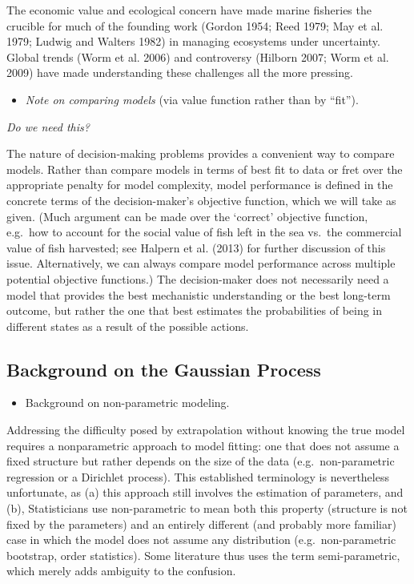 \documentclass[author-year, review]{elsarticle} %
\begin{document}
The economic value and ecological concern have made marine fisheries the
crucible for much of the founding work (Gordon 1954; Reed 1979; May et
al. 1979; Ludwig and Walters 1982) in managing ecosystems under
uncertainty. Global trends (Worm et al. 2006) and controversy (Hilborn
2007; Worm et al. 2009) have made understanding these challenges all the
more pressing.

\begin{itemize}
\itemsep1pt\parskip0pt
\item
  \emph{Note on comparing models} (via value function rather than by
  ``fit'').
\end{itemize}

\emph{Do we need this?}

The nature of decision-making problems provides a convenient way to
compare models. Rather than compare models in terms of best fit to data
or fret over the appropriate penalty for model complexity, model
performance is defined in the concrete terms of the decision-maker's
objective function, which we will take as given. (Much argument can be
made over the `correct' objective function, e.g.~how to account for the
social value of fish left in the sea vs.~the commercial value of fish
harvested; see Halpern et al. (2013) for further discussion of this
issue. Alternatively, we can always compare model performance across
multiple potential objective functions.) The decision-maker does not
necessarily need a model that provides the best mechanistic
understanding or the best long-term outcome, but rather the one that
best estimates the probabilities of being in different states as a
result of the possible actions.

\subsection{Background on the Gaussian
Process}\label{background-on-the-gaussian-process}

\begin{itemize}
\itemsep1pt\parskip0pt
\item
  Background on non-parametric modeling.
\end{itemize}

Addressing the difficulty posed by extrapolation without knowing the
true model requires a nonparametric approach to model fitting: one that
does not assume a fixed structure but rather depends on the size of the
data (e.g.~non-parametric regression or a Dirichlet process). This
established terminology is nevertheless unfortunate, as (a) this
approach still involves the estimation of parameters, and (b),
Statisticians use non-parametric to mean both this property (structure
is not fixed by the parameters) and an entirely different (and probably
more familiar) case in which the model does not assume any distribution
(e.g.~non-parametric bootstrap, order statistics). Some literature thus
uses the term semi-parametric, which merely adds ambiguity to the
confusion.
\end{document}
